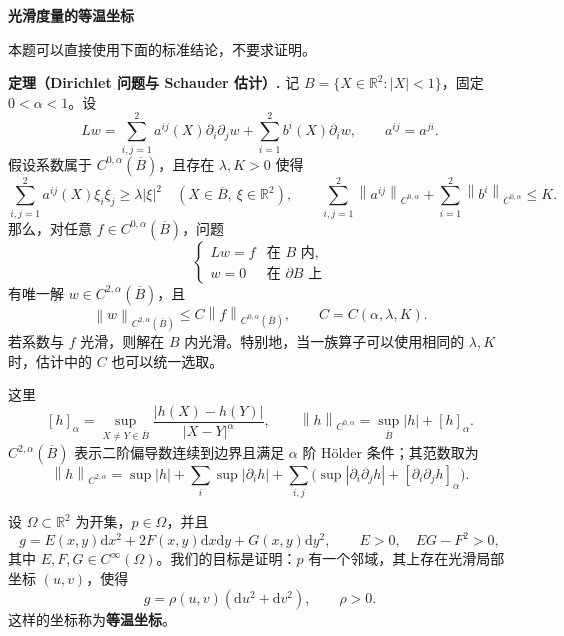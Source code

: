 \documentclass[UTF8,a4paper,10pt,fontset=fandol]{ctexart}
\newcommand{\R}{\mathbb R}
\newcommand{\dd}{\mathrm d}
\newcommand{\norm}[1]{\left\lVert#1\right\rVert}
\newcommand{\pa}{\partial}
\begin{document}
\noindent\textbf{光滑度量的等温坐标}

本题可以直接使用下面的标准结论，不要求证明。

\noindent\textbf{定理（Dirichlet 问题与 Schauder 估计）.}
记 $B=\{X\in\R^2:|X|<1\}$，固定 $0<\alpha<1$。设
\[
Lw=\sum_{i,j=1}^2a^{ij}(X)\pa_i\pa_jw+\sum_{i=1}^2b^i(X)\pa_iw,
\qquad a^{ij}=a^{ji}.
\]
假设系数属于 $C^{0,\alpha}(\overline B)$，且存在 $\lambda,K>0$ 使得
\[
\sum_{i,j=1}^2a^{ij}(X)\xi_i\xi_j\ge\lambda|\xi|^2
\quad(X\in\overline B,\ \xi\in\R^2),\qquad
\sum_{i,j=1}^2\norm{a^{ij}}_{C^{0,\alpha}}+\sum_{i=1}^2\norm{b^i}_{C^{0,\alpha}}\le K.
\]
那么，对任意 $f\in C^{0,\alpha}(\overline B)$，问题
\[
\begin{cases}Lw=f&\text{在 }B\text{ 内},\\ w=0&\text{在 }\pa B\text{ 上}\end{cases}
\]
有唯一解 $w\in C^{2,\alpha}(\overline B)$，且
\[
\norm{w}_{C^{2,\alpha}(\overline B)}\le C\norm{f}_{C^{0,\alpha}(\overline B)},
\qquad C=C(\alpha,\lambda,K).
\]
若系数与 $f$ 光滑，则解在 $B$ 内光滑。特别地，当一族算子可以使用相同的 $\lambda,K$ 时，估计中的 $C$ 也可以统一选取。

这里
\[
[h]_{\alpha}=\sup_{X\ne Y\in\overline B}\frac{|h(X)-h(Y)|}{|X-Y|^{\alpha}},
\qquad \norm{h}_{C^{0,\alpha}}=\sup_{\overline B}|h|+[h]_{\alpha}.
\]
$C^{2,\alpha}(\overline B)$ 表示二阶偏导数连续到边界且满足 $\alpha$ 阶 Hölder 条件；其范数取为
\[
\norm{h}_{C^{2,\alpha}}=
\sup|h|+\sum_i\sup|\pa_i h|+\sum_{i,j}\bigl(\sup|\pa_i\pa_jh|+[\pa_i\pa_jh]_{\alpha}\bigr).
\]

设 $\Omega\subset\R^2$ 为开集，$p\in\Omega$，并且
\[
g=E(x,y)\dd x^2+2F(x,y)\dd x\dd y+G(x,y)\dd y^2,
\qquad E>0,\quad EG-F^2>0,
\]
其中 $E,F,G\in C^\infty(\Omega)$。我们的目标是证明：$p$ 有一个邻域，其上存在光滑局部坐标 $(u,v)$，使得
\[
g=\rho(u,v)(\dd u^2+\dd v^2),\qquad \rho>0.
\]
这样的坐标称为\textbf{等温坐标}。
\end{document}
